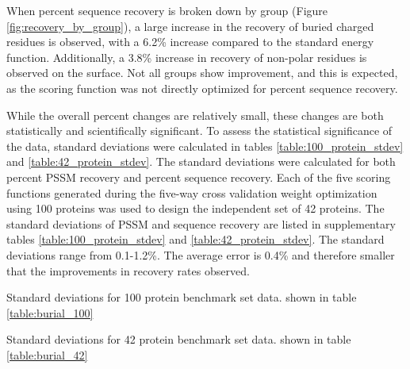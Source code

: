  When percent sequence recovery is broken down by group (Figure \ref{fig:recovery_by_group}), a large increase in the recovery of buried charged residues is observed, with a 6.2\% increase compared to the standard energy function. 
 Additionally, a 3.8\% increase in recovery of non-polar residues is observed on the surface.
 Not all groups show improvement, and this is expected, as the scoring function was not directly optimized for percent sequence recovery.
 
While the overall percent changes are relatively small, these changes are both statistically and scientifically significant.
To assess the statistical significance of the data, standard deviations were calculated in tables \ref{table:100_protein_stdev} and \ref{table:42_protein_stdev}.
The standard deviations were calculated for both percent \ac{PSSM} recovery and percent sequence recovery.
Each of the five scoring functions generated during the five-way cross validation weight optimization using 100 proteins was used to design the independent set of 42 proteins.
The standard deviations of \ac{PSSM} and sequence recovery are listed in supplementary tables \ref{table:100_protein_stdev} and \ref{table:42_protein_stdev}.
The standard deviations range from 0.1-1.2\%. 
The average error is 0.4\% and therefore smaller that the improvements in recovery rates observed. 

\begin{table}
\scriptsize
\renewcommand{\tabcolsep}{0.09cm}
\centering

\caption{Standard deviations for 100 protein benchmark set data. shown in table \ref{table:burial_100}}
\label{table:100_protein_stdev}
\end{table}

\begin{table}
\scriptsize
\renewcommand{\tabcolsep}{0.09cm}
\centering

\caption{Standard deviations for 42 protein benchmark set data. shown in table \ref{table:burial_42}}
\label{table:42_protein_stdev}
\end{table}

